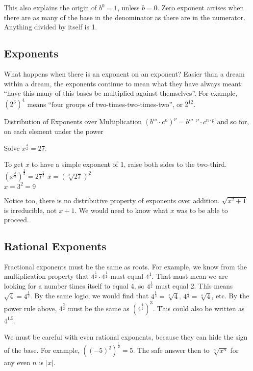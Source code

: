 This also explains the origin of $b^0=1$, unless $b=0$.  Zero exponent arrises when there
are as many of the base in the denominator as there are in the numerator.  Anything
divided by itself is 1.

\subsection{Exponents}
What happens when there is an exponent on an exponent?  Easier than a dream within a
dream, the exponents continue to mean what they have always meant: ``have this many
of this bases be multiplied against themselves''.  For example, $(2^3)^4$ means ``four
groups of two-times-two-times-two'', or $2^12$.

\begin{derivation}{Distribution of Exponents over Multiplication}
$(b^m\cdot c^n)^p=b^{m\cdot p}\cdot c^{n\cdot p}$ and so for, on each element under
the power
\end{derivation}


\begin{example}
\exProblem
Solve $x^{\frac{3}{2}}=27$.

\exSolution
To get $x$ to have a simple exponent of 1, raise both sides to the two-third.\\
$\left(x^\frac{3}{2}\right)^{\frac{2}{3}}=27^{\frac{2}{3}}$
$x=\left(\sqrt[3]{27}\right)^2$\\
$x=3^2=9$
\end{example}

Notice too, there is no distributive property of exponents over addition.  $\sqrt{x^2+1}$
is irreducible, not $x+1$.  We would need to know what $x$ was to be able to proceed.

\subsection{Rational Exponents}
Fractional exponents must be the same as roots.  For example, we know from
the multiplication property that $4^\frac{1}{2}\cdot 4^\frac{1}{2}$ must equal $4^1$.
That must mean we are looking for a number times itself to equal 4, so $4^\frac{1}{2}$
must equal 2.  This means $\sqrt{4}=4^\frac{1}{2}$.  By the same logic, we would 
find that $4^\frac{1}{3}=\sqrt[3]{4}$, $4^\frac{1}{4}=\sqrt[4]{4}$, etc.  By the power
rule above, $4^\frac{3}{2}$ must be the same as $(4^\frac{1}{2})^3$.  This could also
be written as $4^{1.5}$.

We must be careful with even rational exponents, because they can hide the sign of the base.
For example, $((-5)^2)^\frac{1}{2}=5$.  The safe answer then to $\sqrt[n]{x^n}$ for any
even $n$ is $|x|$.
